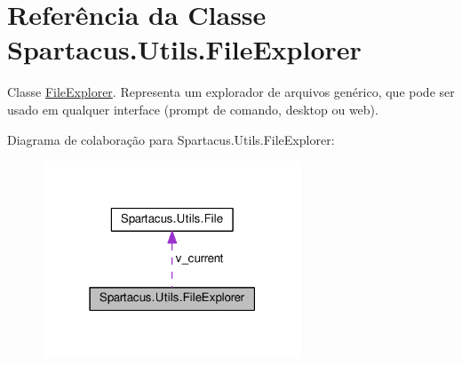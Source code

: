 \hypertarget{classSpartacus_1_1Utils_1_1FileExplorer}{\section{Referência da Classe Spartacus.\+Utils.\+File\+Explorer}
\label{classSpartacus_1_1Utils_1_1FileExplorer}
}


Classe \hyperlink{classSpartacus_1_1Utils_1_1FileExplorer}{File\+Explorer}. Representa um explorador de arquivos genérico, que pode ser usado em qualquer interface (prompt de comando, desktop ou web).  




Diagrama de colaboração para Spartacus.\+Utils.\+File\+Explorer\+:\nopagebreak
\begin{figure}[H]
\begin{center}
\leavevmode
\includegraphics[width=219pt]{classSpartacus_1_1Utils_1_1FileExplorer__coll__graph}
\end{center}
\end{figure}
